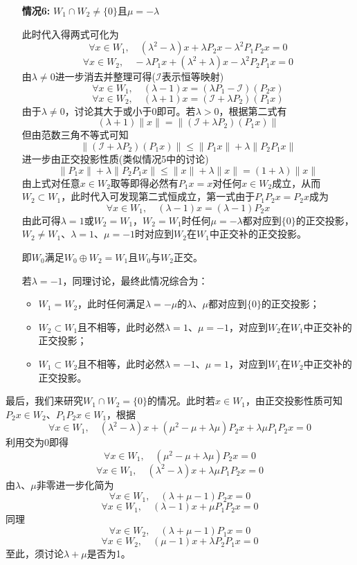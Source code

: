 \documentclass[a4paper,UTF8,fontset=windows,AutoFakeBold]{ctexart}
\newcommand*{\mi}{\mathcal{I}}
\newcommand*{\note}{\noindent *}
\begin{document}
\begin{enumerate}
\begin{itemize}
        \item[\textbf{情况6:}] $W_1\cap W_2\ne\{0\}$且$\mu=-\lambda$
        
        此时代入得两式可化为
        $$\forall x\in W_1,\quad(\lambda^2-\lambda)x+\lambda P_2x-\lambda^2P_1P_2x=0$$
        $$\forall x\in W_2,\quad-\lambda P_1x+(\lambda^2+\lambda)x-\lambda^2P_2P_1x=0$$
        由$\lambda\ne0$进一步消去并整理可得($\mi$表示恒等映射)
        $$\forall x\in W_1,\quad(\lambda-1)x=(\lambda P_1-\mi)(P_2x)$$
        $$\forall x\in W_2,\quad(\lambda+1)x=(\mi+\lambda P_2)(P_1x)$$
        由于$\lambda\ne0$，讨论其大于或小于0即可。若$\lambda>0$，根据第二式有
        $$(\lambda+1)\|x\|=\|(\mi+\lambda P_2)(P_1x)\|$$
        但由范数三角不等式可知
        $$\|(\mi+\lambda P_2)(P_1x)\|\le\|P_1x\|+\lambda\|P_2P_1x\|$$
        进一步由正交投影性质(类似情况5中的讨论)
        $$\|P_1x\|+\lambda\|P_2P_1x\|\le\|x\|+\lambda\|x\|=(1+\lambda)\|x\|$$
        由上式对任意$x\in W_2$取等即得必然有$P_1x=x$对任何$x\in W_2$成立，从而$W_2\subset W_1$，此时代入可发现第二式恒成立，第一式由于$P_1P_2x=P_2x$成为
        $$\forall x\in W_1,\quad(\lambda-1)x=(\lambda-1)P_2x$$
        由此可得$\lambda=1$或$W_2=W_1$，$W_2=W_1$时任何$\mu=-\lambda$都对应到$\{0\}$的正交投影，$W_2\ne W_1$、$\lambda=1$、$\mu=-1$时对应到$W_2$在$W_1$中正交补的正交投影。

        \note 即$W_0$满足$W_0\oplus W_2=W_1$且$W_0$与$W_2$正交。

        若$\lambda=-1$，同理讨论，最终此情况综合为：
        \begin{itemize}
            \item $W_1=W_2$，此时任何满足$\lambda=-\mu$的$\lambda$、$\mu$都对应到$\{0\}$的正交投影；
            \item $W_2\subset W_1$且不相等，此时必然$\lambda=1$、$\mu=-1$，对应到$W_2$在$W_1$中正交补的正交投影；
            \item $W_1\subset W_2$且不相等，此时必然$\lambda=-1$、$\mu=1$，对应到$W_1$在$W_2$中正交补的正交投影。
        \end{itemize}
    \end{itemize}

    最后，我们来研究$W_1\cap W_2=\{0\}$的情况。此时若$x\in W_1$，由正交投影性质可知$P_2x\in W_2$、$P_1P_2x\in W_1$，根据
    $$\forall x\in W_1,\quad(\lambda^2-\lambda)x+(\mu^2-\mu+\lambda\mu)P_2x+\lambda\mu P_1P_2x=0$$
    利用交为0即得
    $$\forall x\in W_1,\quad(\mu^2-\mu+\lambda\mu)P_2x=0$$
    $$\forall x\in W_1,\quad(\lambda^2-\lambda)x+\lambda\mu P_1P_2x=0$$
    由$\lambda$、$\mu$非零进一步化简为
    $$\forall x\in W_1,\quad(\lambda+\mu-1)P_2x=0$$
    $$\forall x\in W_1,\quad(\lambda-1)x+\mu P_1P_2x=0$$
    同理
    $$\forall x\in W_2,\quad(\lambda+\mu-1)P_1x=0$$
    $$\forall x\in W_2,\quad(\mu-1)x+\lambda P_2P_1x=0$$
    至此，须讨论$\lambda+\mu$是否为1。


\end{enumerate}
\end{document}
